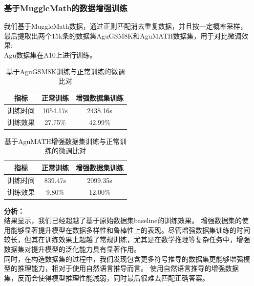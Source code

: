 \documentclass{article}
\begin{document}
\subsubsection{基于MuggleMath的数据增强训练}
我们基于MuggleMath数据，通过正则匹配消去重复数据，并且按一定概率采样，最后提取出两个15k条的数据集AguGSM8K和AguMATH数据集，用于对比微调效果:
\\ Agu数据集在A10上进行训练。
\begin{table}[H]
  \caption{基于AguGSM8K训练与正常训练的微调比对}
  \label{gsm8k-augmentation-comparison-table}
  \centering
  \begin{tabular}{|c|c|c|}
    \hline
    \textbf{指标} & \textbf{正常训练} & \textbf{增强数据集训练} \\ \hline
    训练时间 & 1054.17s & 2438.16s \\ \hline
    训练效果 & 27.75\% & 42.99\% \\ \hline
  \end{tabular}
\end{table}


\begin{table}[H]
  \caption{基于AguMATH增强数据集训练与正常训练的微调比对}
  \label{math-augmentation-comparison-table}
  \centering
  \begin{tabular}{|c|c|c|}
    \hline
    \textbf{指标} & \textbf{正常训练} & \textbf{增强数据集训练} \\ \hline
    训练时间 & 839.47s & 2099.35s \\ \hline
    训练效果 & 9.80\% & 12.00\% \\ \hline
  \end{tabular}
\end{table}

\textbf{分析：}\\
结果显示，我们已经超越了基于原始数据集baseline的训练效果。
增强数据集的使用能够显著提升模型在数据多样性和鲁棒性上的表现。尽管增强数据集训练的时间较长，但其在训练效果上超越了常规训练，尤其是在数学推理等复杂任务中，增强数据集对提升模型的泛化能力具有显著作用。
\\
同时，在构造数据集的过程中，我们发现包含更多符号推导的数据集更能够增强模型的推理能力，相对于使用自然语言推导而言。
使用自然语言推导的增强数据集，反而会使得模型推理性能减弱，同时最后很难去匹配正确答案。
\end{document}
